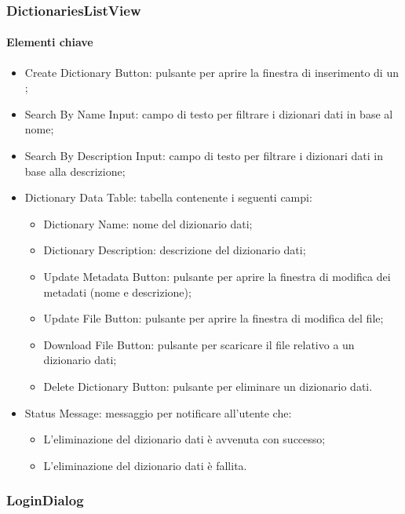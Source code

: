 \subsubsection{DictionariesListView}

\paragraph*{Elementi chiave}
\begin{itemize}
  \item Create Dictionary Button: pulsante per aprire la finestra di inserimento di un ;
  \item Search By Name Input: campo di testo per filtrare i dizionari dati in base al nome;
  \item Search By Description Input: campo di testo per filtrare i dizionari dati in base alla descrizione;
  \item Dictionary Data Table: tabella contenente i seguenti campi:
  \begin{itemize}
    \item Dictionary Name: nome del dizionario dati;
    \item Dictionary Description: descrizione del dizionario dati;
    \item Update Metadata Button: pulsante per aprire la finestra di modifica dei metadati (nome e descrizione);
    \item Update File Button: pulsante per aprire la finestra di modifica del file;
    \item Download File Button: pulsante per scaricare il file relativo a un dizionario dati;
    \item Delete Dictionary Button: pulsante per eliminare un dizionario dati.
  \end{itemize}
  \item Status Message: messaggio per notificare all'utente che:
  \begin{itemize}
    \item L'eliminazione del dizionario dati è avvenuta con successo;
    \item L'eliminazione del dizionario dati è fallita.
  \end{itemize}
\end{itemize}

\subsubsection{LoginDialog}

